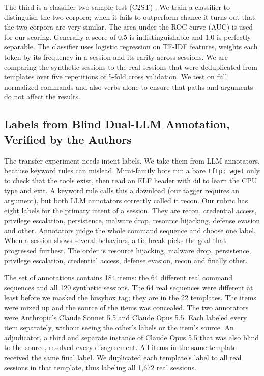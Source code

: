 \documentclass[runningheads]{llncs}
\begin{document}
The third is a classifier two-sample test (C2ST) \cite{lopezpaz2017c2st}. We train a classifier to distinguish the two corpora; when it fails to outperform chance it turns out that the two corpora are very similar. The area under the ROC curve (AUC) is used for our scoring. Generally a score of 0.5 is indistinguishable and 1.0 is perfectly separable. The classifier uses logistic regression on TF-IDF features, weights each token by its frequency in a session and its rarity across sessions. We are comparing the synthetic sessions to the real sessions that were deduplicated from templates over five repetitions of 5-fold cross validation. We test on full normalized commands and also verbs alone to ensure that paths and arguments do not affect the results.

\subsection{Labels from Blind Dual-LLM Annotation, Verified by the Authors}

The transfer experiment needs intent labels. We take them from LLM annotators, because keyword rules can mislead. Mirai-family bots run a bare \texttt{tftp; wget} only to check that the tools exist, then read an ELF header with \texttt{dd} to learn the CPU type and exit. A keyword rule calls this a download (our tagger requires an argument), but both LLM annotators correctly called it recon. Our rubric has eight labels for the primary intent of a session. They are recon, credential access, privilege escalation, persistence, malware drop, resource hijacking, defense evasion and other. Annotators judge the whole command sequence and choose one label. When a session shows several behaviors, a tie-break picks the goal that progressed furthest. The order is resource hijacking, malware drop, persistence, privilege escalation, credential access, defense evasion, recon and finally other.

The set of annotations contains 184 items: the 64 different real command sequences and all 120 synthetic sessions. The 64 real sequences were different at least before we masked the busybox tag; they are in the 22 templates. The items were mixed up and the source of the items was concealed. The two annotators were Anthropic's Claude Sonnet 5.5 and Claude Opus 5.5. Each labeled every item separately, without seeing the other's labels or the item's source. An adjudicator, a third and separate instance of Claude Opus 5.5 that was also blind to the source, resolved every disagreement. All items in the same template received the same final label. We duplicated each template's label to all real sessions in that template, thus labeling all 1,672 real sessions.
\end{document}
